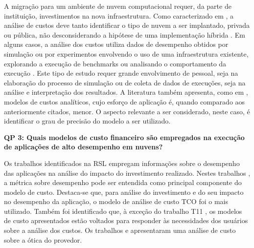 \documentclass[tese,capa]{texufpel}
\begin{document}
A migração para um ambiente de nuvem computacional requer, da parte de instituição, investimentos na nova infraestrutura. Como caracterizado em \cite{dreherCostAnalysisComparing2017e, guerreroPerformanceCostModel2014b}, a análise de custos deve tanto identificar o tipo de nuvem a ser implantado, privada ou pública, não desconsiderando a hipótese de uma implementação híbrida \cite{guptaEvaluatingImprovingPerformance2016d, sadooghiUnderstandingPerformancePotential2017d}. Em alguns casos, a análise dos custos utiliza dados de desempenho obtidos por simulação \cite{shenCostOptimizedResourceProvision2014b, guptaEvaluatingImprovingPerformance2016d, arabnejadSchedulingDeadlineConstrained2017c} ou por experimentos envolvendo o uso de uma infraestrutura existente, explorando a execução de benchmarks \cite{roloffHighPerformanceComputing2012c, maratheComparativeStudyHighperformance2013c, guptaEvaluatingImprovingPerformance2016d, prukkantragornPriceEfficiencyHigh2016b, roloffHPCApplicationPerformance2017c, sadooghiUnderstandingPerformancePotential2017d, emerasAmazonElasticCompute2019c, roloffExploringInstanceHeterogeneity2019a} ou analisando o comportamento da execução \cite{maratheComparativeStudyHighperformance2013c, arabnejadSchedulingDeadlineConstrained2017c}. Este tipo de estudo requer grande envolvimento de pessoal, seja na elaboração do processo de simulação ou de coleta de dados de execuções, seja na análise e interpretação dos resultados. A literatura também apresenta, como em \cite{roloffHighPerformanceComputing2012c, maratheComparativeStudyHighperformance2013c, guerreroPerformanceCostModel2014b, shenCostOptimizedResourceProvision2014b, prukkantragornPriceEfficiencyHigh2016b, dreherCostAnalysisComparing2017e, sadooghiUnderstandingPerformancePotential2017d, emerasAmazonElasticCompute2019c}, modelos de custos analíticos, cujo esforço de aplicação é, quando comparado aos anteriormente citados, menor. O aspecto relevante a ser considerado, neste caso, é identificar o grau de precisão do modelo a ser utilizado.

\textbf{QP 3: Quais modelos de custo financeiro são empregados na execução de aplicações de alto desempenho em nuvens?}

Os trabalhos identificados na RSL empregam informações sobre o desempenho das aplicações na análise do impacto do investimento realizado. Nestes trabalhos \cite{roloffHighPerformanceComputing2012c, maratheComparativeStudyHighperformance2013c, guptaEvaluatingImprovingPerformance2016d, roloffHPCApplicationPerformance2017c, sadooghiUnderstandingPerformancePotential2017d, prukkantragornPriceEfficiencyHigh2016b, emerasAmazonElasticCompute2019c}, a métrica sobre desempenho pode ser entendida como principal componente do modelo de custo. Destaca-se que, para análise do investimento e do seu impacto no desempenho da aplicação, o modelo de análise de custo TCO foi o mais utilizado. Também foi identificado que, à exceção do trabalho T11 \cite{emerasAmazonElasticCompute2019c}, os modelos de custo apresentados estão voltados para responder às necessidades dos usuários sobre a análise dos custos. Os trabalhos \cite{shenCostOptimizedResourceProvision2014b} e \cite{guptaEvaluatingImprovingPerformance2016d} apresentaram uma análise de custo sobre a ótica do provedor.
\end{document}
